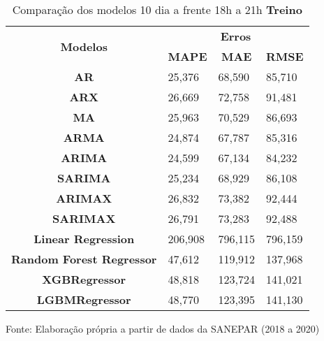 \begin{table}[H]
	\centering
	\caption{Comparação dos modelos 10 dia a frente 18h a 21h \textbf{Treino} }\label{tb:10-18trn}
	\begin{tabular}{@{}clll@{}}
		\toprule
		\multirow{2}{*}{\textbf{Modelos}} & \multicolumn{3}{c}{\textbf{Erros}}                                                                       \\ \cmidrule(l){2-4} 
		& \multicolumn{1}{c}{\textbf{MAPE}} & \multicolumn{1}{c}{\textbf{MAE}} & \multicolumn{1}{c}{\textbf{RMSE}} \\ \hline
\textbf{AR}                       & 25,376                            & 68,590                           & 85,710                            \\
\textbf{ARX}                      & 26,669                            & 72,758                           & 91,481                            \\
\textbf{MA}                       & 25,963                            & 70,529                           & 86,693                            \\
\textbf{ARMA}                     & 24,874                            & 67,787                           & 85,316                            \\
\textbf{ARIMA}                    & 24,599                            & 67,134                           & 84,232                            \\
\textbf{SARIMA}                   & 25,234                            & 68,929                           & 86,108                            \\
\textbf{ARIMAX}                   & 26,832                            & 73,382                           & 92,444                            \\
\textbf{SARIMAX}                  & 26,791                            & 73,283                           & 92,488                            \\
\textbf{Linear Regression}        & 206,908                           & 796,115                          & 796,159                           \\
\textbf{Random Forest Regressor}  & 47,612                            & 119,912                          & 137,968                           \\
\textbf{XGBRegressor}             & 48,818                            & 123,724                          & 141,021                           \\
\textbf{LGBMRegressor}            & 48,770                            & 123,395                          & 141,130                           \\ \bottomrule
	\end{tabular}

Fonte: Elaboração própria a partir de dados da SANEPAR (2018 a 2020)
\end{table}

